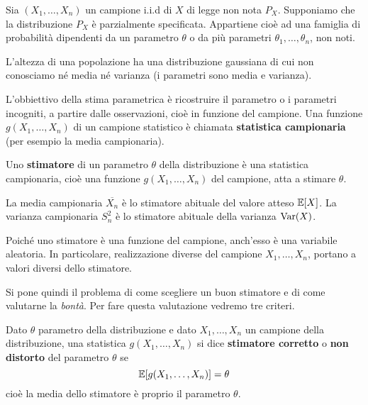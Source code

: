 Sia $(X_1, \dots, X_n)$ un campione i.i.d di $X$ di legge non nota $P_X$. Supponiamo che la
distribuzione $P_X$ è parzialmente specificata. Appartiene cioè ad una famiglia di probabilità
dipendenti da un parametro $\theta$ o da più parametri $\theta_1, \dots, \theta_n$, non noti.

\begin{example}
	L'altezza di una popolazione ha una distribuzione gaussiana di cui non conosciamo né media né
	varianza (i parametri sono media e varianza).
\end{example}

\label{def: statistica campionaria}
L'obbiettivo della stima parametrica è ricostruire il parametro o i parametri incogniti, a partire
dalle osservazioni, cioè in funzione del campione. Una funzione $g(X_1, \dots, X_n)$ di un campione
statistico è chiamata \textbf{statistica campionaria} (per esempio la media campionaria).

\label{def: stimatore}
Uno \textbf{stimatore} di un parametro $\theta$ della distribuzione è una statistica campionaria,
cioè una funzione $g(X_1, \dots, X_n)$ del campione, atta a stimare $\theta$.

\begin{example}
	La media campionaria $\overline{X_n}$ è lo stimatore abituale del valore atteso $\mathbb{E}[X]$. La
	varianza campionaria $S_n^2$ è lo stimatore abituale della varianza $\operatorname{Var}(X)$.
\end{example}

\begin{observation}
	Poiché uno stimatore è una funzione del campione, anch'esso è una variabile aleatoria. In
	particolare, realizzazione diverse del campione $X_1, \dots, X_n$, portano a valori diversi
	dello stimatore.
\end{observation}

Si pone quindi il problema di come scegliere un buon stimatore e di come valutarne la \emph{bontà}.
Per fare questa valutazione vedremo tre criteri.

\begin{definition}\label{def: stimatore corretto}
	Dato $\theta$ parametro della distribuzione e dato $X_1, \dots, X_n$ un campione della
	distribuzione, una statistica $g(X_1, \dots, X_n)$ si dice \textbf{stimatore corretto} o
	\textbf{non distorto} del parametro $\theta$ se
	\[ \mathbb{E}[g(X_1, \dots, X_n)] = \theta \]
	cioè la media dello stimatore è proprio il parametro $\theta$.
\end{definition}

